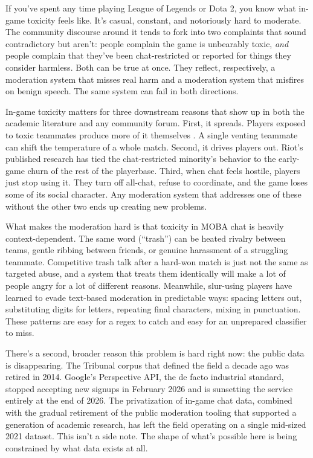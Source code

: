 \documentclass[11pt,twocolumn,letterpaper]{article}
\begin{document}
If you've spent any time playing League of Legends or Dota 2, you know what in-game toxicity feels like. It's casual, constant, and notoriously hard to moderate. The community discourse around it tends to fork into two complaints that sound contradictory but aren't: people complain the game is unbearably toxic, \textit{and} people complain that they've been chat-restricted or reported for things they consider harmless. Both can be true at once. They reflect, respectively, a moderation system that misses real harm and a moderation system that misfires on benign speech. The same system can fail in both directions.

In-game toxicity matters for three downstream reasons that show up in both the academic literature and any community forum. First, it spreads. Players exposed to toxic teammates produce more of it themselves \cite{shores2014, martens2015}. A single venting teammate can shift the temperature of a whole match. Second, it drives players out. Riot's published research has tied the chat-restricted minority's behavior to the early-game churn of the rest of the playerbase. Third, when chat feels hostile, players just stop using it. They turn off all-chat, refuse to coordinate, and the game loses some of its social character. Any moderation system that addresses one of these without the other two ends up creating new problems.

What makes the moderation hard is that toxicity in MOBA chat is heavily context-dependent. The same word (``trash'') can be heated rivalry between teams, gentle ribbing between friends, or genuine harassment of a struggling teammate. Competitive trash talk after a hard-won match is just not the same as targeted abuse, and a system that treats them identically will make a lot of people angry for a lot of different reasons. Meanwhile, slur-using players have learned to evade text-based moderation in predictable ways: spacing letters out, substituting digits for letters, repeating final characters, mixing in punctuation. These patterns are easy for a regex to catch and easy for an unprepared classifier to miss.

There's a second, broader reason this problem is hard right now: the public data is disappearing. The Tribunal corpus that defined the field a decade ago was retired in 2014. Google's Perspective API, the de facto industrial standard, stopped accepting new signups in February 2026 and is sunsetting the service entirely at the end of 2026. The privatization of in-game chat data, combined with the gradual retirement of the public moderation tooling that supported a generation of academic research, has left the field operating on a single mid-sized 2021 dataset. This isn't a side note. The shape of what's possible here is being constrained by what data exists at all.
\end{document}
